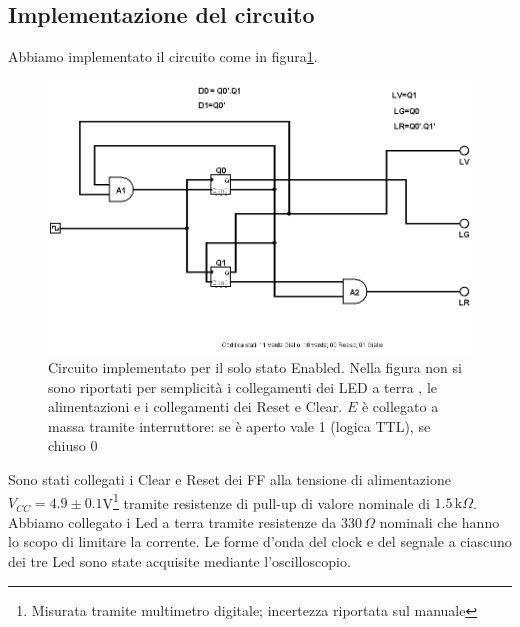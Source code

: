\documentclass[10pt,a4paper]{article}
\begin{document}
\subsection{Implementazione del circuito}
Abbiamo implementato il circuito come in figura\ref{fig:circenable}.
\begin{figure}[!htb]
\centering
\includegraphics[scale=0.5]{circenable.png}
\caption{Circuito implementato per il solo stato Enabled. Nella figura non si sono riportati per semplicità i collegamenti dei LED a terra , le alimentazioni e i collegamenti dei Reset e Clear. $E$ è collegato a massa tramite interruttore: se è aperto vale 1 (logica TTL), se chiuso 0\label{fig:circenable}}
\end{figure}
Sono stati collegati i Clear e Reset dei FF alla tensione di alimentazione $V_{CC} = 4.9\pm0.1 $V\footnote{Misurata tramite multimetro digitale; incertezza riportata sul manuale} tramite resistenze di pull-up di valore nominale di $1.5\,\mbox{k}\Omega$. Abbiamo collegato i Led a terra tramite resistenze da $330\,\Omega$ nominali che hanno lo scopo di limitare la corrente.
Le forme d'onda del clock e del segnale a ciascuno dei tre Led sono state acquisite mediante l'oscilloscopio.
\end{document}
